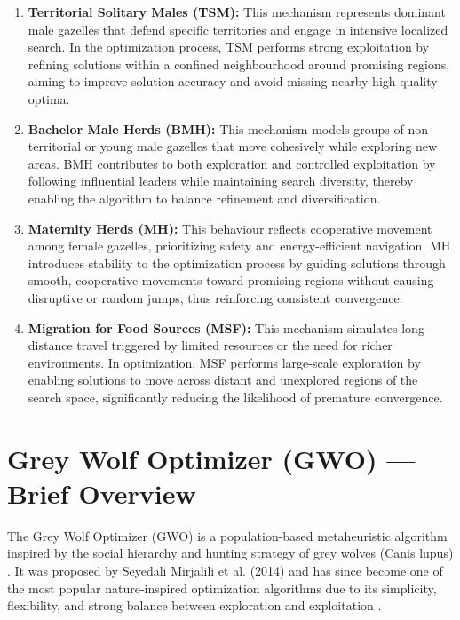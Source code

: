 \documentclass[12pt,a4paper]{article}
\begin{document}
\begin{enumerate}
    \item \textbf{Territorial Solitary Males (TSM):} This mechanism represents dominant male gazelles that defend specific territories and engage in intensive localized search. In the optimization process, TSM performs strong exploitation by refining solutions within a confined neighbourhood around promising regions, aiming to improve solution accuracy and avoid missing nearby high-quality optima.

    \item \textbf{Bachelor Male Herds (BMH):} This mechanism models groups of non-territorial or young male gazelles that move cohesively while exploring new areas. BMH contributes to both exploration and controlled exploitation by following influential leaders while maintaining search diversity, thereby enabling the algorithm to balance refinement and diversification.

    \item \textbf{Maternity Herds (MH):} This behaviour reflects cooperative movement among female gazelles, prioritizing safety and energy-efficient navigation. MH introduces stability to the optimization process by guiding solutions through smooth, cooperative movements toward promising regions without causing disruptive or random jumps, thus reinforcing consistent convergence.

    \item \textbf{Migration for Food Sources (MSF):} This mechanism simulates long-distance travel triggered by limited resources or the need for richer environments. In optimization, MSF performs large-scale exploration by enabling solutions to move across distant and unexplored regions of the search space, significantly reducing the likelihood of premature convergence.
\end{enumerate}


\newpage
\section{Grey Wolf Optimizer (GWO) — Brief Overview}
The Grey Wolf Optimizer (GWO) is a population-based metaheuristic algorithm inspired by the social hierarchy and hunting strategy of grey wolves (Canis lupus) \cite{gwo}. It was proposed by Seyedali Mirjalili et al. (2014) and has since become one of the most popular nature-inspired optimization algorithms due to its simplicity, flexibility, and strong balance between exploration and exploitation \cite{metaheuristics}.
\end{document}

